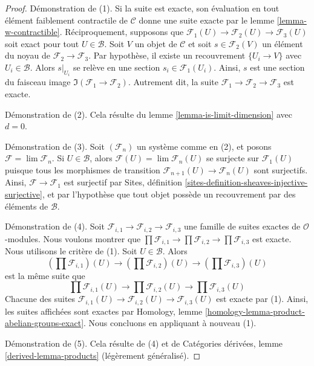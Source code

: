 \begin{proof}
Démonstration de (1). Si la suite est exacte, son évaluation en tout élément
faiblement contractile de $\mathcal{C}$ donne une suite exacte par le lemme
\ref{lemma-w-contractible}. Réciproquement, supposons que
$\mathcal{F}_1(U) \to \mathcal{F}_2(U) \to \mathcal{F}_3(U)$
soit exact pour tout $U \in \mathcal{B}$. Soit $V$ un objet de
$\mathcal{C}$ et soit $s \in \mathcal{F}_2(V)$ un élément du noyau de
$\mathcal{F}_2 \to \mathcal{F}_3$. Par hypothèse, il existe un recouvrement
$\{U_i \to V\}$ avec $U_i \in \mathcal{B}$. Alors $s|_{U_i}$ se relève en
une section $s_i \in \mathcal{F}_1(U_i)$. Ainsi, $s$ est une section du
faisceau image $\Im(\mathcal{F}_1 \to \mathcal{F}_2)$. Autrement dit, la
suite $\mathcal{F}_1 \to \mathcal{F}_2 \to \mathcal{F}_3$ est exacte.

\medskip\noindent
Démonstration de (2). Cela résulte du lemme
\ref{lemma-is-limit-dimension} avec $d = 0$.

\medskip\noindent
Démonstration de (3). Soit $(\mathcal{F}_n)$ un système comme en (2), et
posons $\mathcal{F} = \lim \mathcal{F}_n$. Si $U \in \mathcal{B}$, alors
$\mathcal{F}(U) = \lim \mathcal{F}_n(U)$
se surjecte sur $\mathcal{F}_1(U)$ puisque tous les morphismes de transition
$\mathcal{F}_{n + 1}(U) \to \mathcal{F}_n(U)$ sont surjectifs. Ainsi,
$\mathcal{F} \to \mathcal{F}_1$ est surjectif par Sites, définition
\ref{sites-definition-sheaves-injective-surjective}, et par l'hypothèse que
tout objet possède un recouvrement par des éléments de $\mathcal{B}$.

\medskip\noindent
Démonstration de (4). Soit
$\mathcal{F}_{i, 1} \to \mathcal{F}_{i, 2} \to \mathcal{F}_{i, 3}$
une famille de suites exactes de $\mathcal{O}$-modules. Nous voulons montrer
que
$\prod \mathcal{F}_{i, 1} \to \prod \mathcal{F}_{i, 2} \to
\prod \mathcal{F}_{i, 3}$ est exacte. Nous utilisons le critère de (1).
Soit $U \in \mathcal{B}$. Alors
$$
(\prod \mathcal{F}_{i, 1})(U) \to
(\prod \mathcal{F}_{i, 2})(U) \to
(\prod \mathcal{F}_{i, 3})(U)
$$
est la même suite que
$$
\prod \mathcal{F}_{i, 1}(U) \to
\prod \mathcal{F}_{i, 2}(U) \to
\prod \mathcal{F}_{i, 3}(U)
$$
Chacune des suites
$\mathcal{F}_{i, 1}(U) \to \mathcal{F}_{i, 2}(U) \to \mathcal{F}_{i, 3}(U)$
est exacte par (1). Ainsi, les suites affichées sont exactes par Homology,
lemme \ref{homology-lemma-product-abelian-groups-exact}. Nous concluons en
appliquant à nouveau (1).

\medskip\noindent
Démonstration de (5). Cela résulte de (4) et de Catégories dérivées, lemme
\ref{derived-lemma-products} (légèrement généralisé).


\end{proof}
